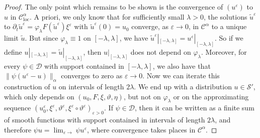 \documentclass[11pt,a4paper]{article}
\newcommand{\tmop}[1]{\ensuremath{\operatorname{#1}}}
\theoremstyle{remark}
\newcommand{\CC}{\ensuremath{\mathscr{C}}}
\newcommand{\CD}{\ensuremath{\mathscr{D}}}
\newcommand{\CS}{\ensuremath{\mathscr{S}}}
\begin{document}
\begin{proof}
  The only point which remains to be shown is the convergence of $(u^{\varepsilon} )$ to $u$ in $\CC^{\alpha}_{\tmop{loc}}$. A priori,
  we only know that for sufficiently small $\lambda >0$, the solutions
  $\tilde{u}^{\varepsilon}$ to $\partial_{t} \tilde{u}^{\varepsilon} = \varphi_{\lambda} F ( \tilde{u}^{\varepsilon} ) \xi^{\varepsilon}$ with
  $\tilde{u}^{\varepsilon} ( 0 ) =u_{0}$ converge, as $\varepsilon \rightarrow 0$, in $  \CC^{\alpha}$ to a unique limit $\tilde{u}$.
  But since $\varphi_{\lambda} \equiv 1$ on $[ - \lambda, \lambda]$, we
  have $\tilde{u}^{\varepsilon} |_{[ - \lambda, \lambda]} =u^{\varepsilon} |_{[ - \lambda, \lambda ]}$. So if we define $u|_{[ -  \lambda, \lambda ]} = \tilde{u} |_{[ - \lambda, \lambda]}$, then
  $u|_{[ - \lambda, \lambda]}$ does not depend on $\varphi_{\lambda}$.
  Moreover, for every $\psi \in \CD$ with support contained in $[ - \lambda, \lambda]$, we also have that $\| \psi ( u^{\varepsilon} -u ) \|_{\alpha}$ converges to zero as $\varepsilon \rightarrow 0$. Now we can
  iterate this construction of $u$ on intervals of length $2 \lambda$. We
  end up with a distribution $u \in \CS'$, which only depends
  on $( u_{0} ,F, \xi , \vartheta , \eta )$, but not on $\varphi_{\lambda}$
  or on the approximating sequence $(u_0^\varepsilon, \xi^{\varepsilon} , \vartheta^{\varepsilon} , \xi^{\varepsilon} \circ \vartheta^{\varepsilon} )_{\varepsilon >0}$. If $\psi \in \CD$, then it can be written as a
  finite sum of smooth functions with support contained in intervals of length
  $2 \lambda$, and therefore $\psi u= \lim_{\varepsilon \rightarrow} \psi u^{\varepsilon}$, where convergence takes places in $\CC^{\alpha}$.
\end{proof}
\end{document}
